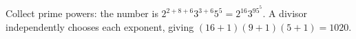 Collect prime powers: the number is $2^{2+8+6}3^{3+6}5^5=2^{16}3^95^5$. A divisor independently chooses each exponent, giving $(16+1)(9+1)(5+1)=\boxed{1020}$.
